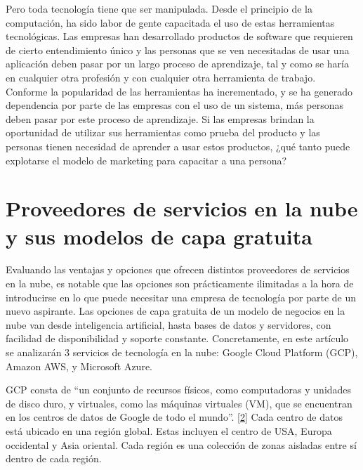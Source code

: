 \documentclass[12pt,spanish,Letterpaper,openany]{book}
\newcommand{\spacefourmilis}{\vspace{4mm}}
\begin{document}
\spacefourmilis

Pero toda tecnología tiene que ser manipulada. Desde el principio de la computación, ha sido labor de gente capacitada el uso de estas herramientas tecnológicas. Las empresas han desarrollado productos de software que requieren de cierto entendimiento único y las personas que se ven necesitadas de usar una aplicación deben pasar por un largo proceso de aprendizaje, tal y como se haría en cualquier otra profesión y con cualquier otra herramienta de trabajo. Conforme la popularidad de las herramientas ha incrementado, y se ha generado dependencia por parte de las empresas con el uso de un sistema, más personas deben pasar por este proceso de aprendizaje. Si las empresas brindan la oportunidad de utilizar sus herramientas como prueba del producto y las personas tienen necesidad de aprender a usar estos productos, ¿qué tanto puede explotarse el modelo de marketing para capacitar a una persona?

\hypertarget{proveedores-de-servicios-en-la-nube-y-sus-modelos-de-capa-gratuita}{%
\section{Proveedores de servicios en la nube y sus modelos de capa gratuita}\label{proveedores-de-servicios-en-la-nube-y-sus-modelos-de-capa-gratuita}}

Evaluando las ventajas y opciones que ofrecen distintos proveedores de servicios en la nube, es notable que las opciones son prácticamente ilimitadas a la hora de introducirse en lo que puede necesitar una empresa de tecnología por parte de un nuevo aspirante. Las opciones de capa gratuita de un modelo de negocios en la nube van desde inteligencia artificial, hasta bases de datos y servidores, con facilidad de disponibilidad y soporte constante. Concretamente, en este artículo se analizarán 3 servicios de tecnología en la nube: Google Cloud Platform (GCP), Amazon AWS, y Microsoft Azure.

\hypertarget{articulo10_cross02}{}

GCP consta de ``un conjunto de recursos físicos, como computadoras y unidades de disco duro, y virtuales, como las máquinas virtuales (VM), que se encuentran en los centros de datos de Google de todo el mundo''. \protect\hyperlink{articulo10_ref02}{{[}2{]}} Cada centro de datos está ubicado en una región global. Estas incluyen el centro de USA, Europa occidental y Asia oriental. Cada región es una colección de zonas aisladas entre sí dentro de cada región.
\end{document}
